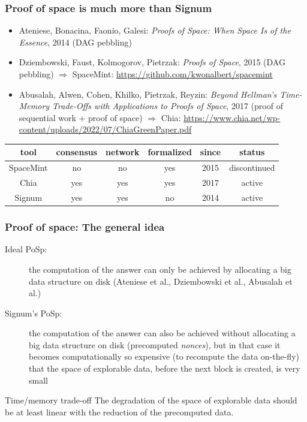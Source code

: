\documentclass[11pt]{beamer}  %
\begin{document}
\begin{frame}\frametitle{Proof of space is much more than Signum}

  \begin{greenbox}{}
    \begin{itemize}
    \item Ateniese, Bonacina, Faonio, Galesi: \emph{Proofs of Space: When Space Is of the Essence}, 2014 (DAG pebbling)
    \item Dziembowski, Faust, Kolmogorov, Pietrzak: \emph{Proofs of Space}, 2015 (DAG pebbling) $\Rightarrow$
      {\color{red}SpaceMint}: \url{https://github.com/kwonalbert/spacemint}
    \item Abusalah, Alwen, Cohen, Khilko, Pietrzak, Reyzin: \emph{Beyond Hellman's Time-Memory Trade-Offs with Applications to Proofs of Space}, 2017 (proof of sequential work + proof of space) $\Rightarrow$ {\color{red}Chia}: \url{https://www.chia.net/wp-content/uploads/2022/07/ChiaGreenPaper.pdf}
    \end{itemize}

  \begin{center}
    {\small\begin{tabular}{c|c|c|c|c|c}
      tool & consensus & network & formalized & since & status \\\hline\hline
      SpaceMint & no & no & yes & 2015 & discontinued\\\hline
      Chia & yes & yes & yes & 2017 & active\\\hline
      Signum & yes & yes & no & 2014 & active\\\hline
    \end{tabular}}
  \end{center}
  \end{greenbox}
  
\end{frame}

\begin{frame}\frametitle{Proof of space: The general idea}

  \begin{description}
  \item[Ideal PoSp:] the computation of the answer can only be achieved by allocating
    a big data structure on disk (Ateniese et al., Dziembowski et al., Abusalah et al.)
    \medskip
  \item[Signum's PoSp:] the computation of the answer can also be achieved without
    allocating a big data structure on disk (precomputed \emph{nonces}),
    but in that case it becomes
    computationally so expensive (to recompute the data on-the-fly)
    that the space of explorable data, before the next block is created, is very small
  \end{description}

  \bigskip
  
  \begin{redbox}{Time/memory trade-off}
    The degradation of the space of explorable data should be at least linear with
    the reduction of the precomputed data.
  \end{redbox}

\end{frame}
\end{document}
